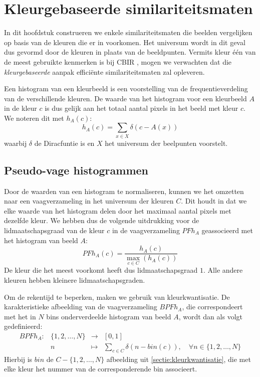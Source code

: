 \chapter{Kleurgebaseerde similariteitsmaten}

In dit hoofdstuk construeren we enkele similariteitsmaten die beelden 
vergelijken op basis van de kleuren die er in voorkomen. Het universum wordt
in dit geval dus gevormd door de kleuren in plaats van de beeldpunten. Vermits kleur \'e\'en 
van de meest gebruikte kenmerken is bij CBIR \cite{rui:image_retr}, mogen we 
verwachten dat die \emph{kleurgebaseerde} aanpak effici\"ente 
similariteitsmaten zal opleveren. 

Een histogram van een kleurbeeld is een voorstelling van de frequentieverdeling 
van de verschillende kleuren. De waarde van het histogram voor een kleurbeeld 
$A$ in de kleur $c$ is dus gelijk aan het totaal aantal pixels in het beeld met 
kleur $c$. We noteren dit met $h_A(c)$: $$ h_A(c) = \sum_{x \in X} \delta (c - 
A(x)) $$ waarbij $\delta$ de Diracfuntie is en $X$ het universum der beelpunten 
voorstelt.


\section{Pseudo-vage histogrammen}

Door de waarden van een histogram te normaliseren, kunnen we het omzetten naar 
een vaagverzameling in het universum der kleuren $C$. Dit houdt in dat we elke 
waarde van het histogram delen door het maximaal aantal pixels met dezelfde 
kleur. We hebben dus de volgende uitdrukking voor de lidmaatschapsgraad van de 
kleur $c$ in de vaagverzameling $\mathit{PFh}_A$ geassocieerd met het histogram 
van beeld $A$: $$
\mathit{PFh}_A(c) = \frac{\displaystyle h_A(c)}{\displaystyle \max_{c \in C}(h_A(c))}
$$ De kleur die het meest voorkomt heeft dus lidmaatschapsgraad $1$. Alle 
andere kleuren hebben kleinere lidmaatschapsgraden.


Om de rekentijd te beperken, maken we gebruik van kleurkwantisatie. 
De karakteristieke afbeelding van de vaagverzameling $\mathit{BPFh}_A$, die
correspondeert met het in $N$ bins onderverdeelde histogram van beeld $A$, wordt dan als volgt
gedefinieerd:  
$$
\begin{array}{lrcl}
\mathit{BPFh}_A: 	& \{1,2,\ldots,N\} 	& \to 		& [0,1] \\[5pt]
		& n						& \mapsto	& \displaystyle\sum_{c \in C} \delta (n -  bin(c)),
\quad\forall n \in \{1,2,\ldots,N\}
\end{array}
$$
Hierbij is $bin$ de $C - \{1,2,\ldots,N\}$ afbeelding uit \ref{sectie:kleurkwantisatie}, die met 
elke kleur het nummer van de corresponderende bin associeert. 


